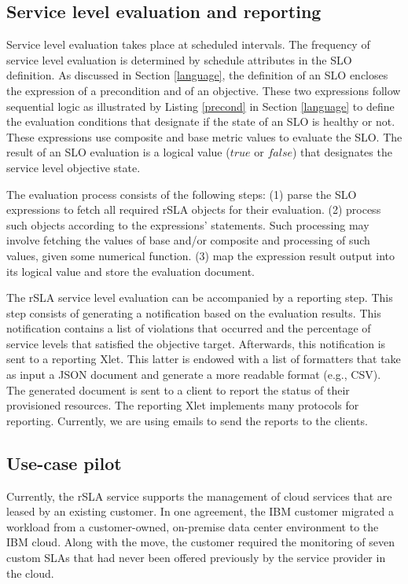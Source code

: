 \subsection{Service level evaluation and reporting}

Service level evaluation takes place at scheduled intervals. The frequency of service level evaluation is determined by schedule attributes in the SLO definition. As discussed in Section \ref{language}, the definition of an SLO encloses the expression of a precondition and of an objective. 
These two expressions follow sequential logic as illustrated by Listing \ref{precond} in Section \ref{language} to define the evaluation conditions that designate if the state of an SLO is healthy or not. These expressions use composite and base metric values to evaluate the SLO. The result of an SLO evaluation is a logical value ($true$ or $false$) that designates the service level objective state.

The evaluation process consists of the following steps: (1) parse the SLO expressions to fetch all required rSLA objects for their evaluation. (2) process such objects according to the expressions' statements. Such processing may involve fetching the values of base and/or composite and processing of such values, given some numerical function. (3) map the expression result output into its logical value and store the evaluation document.

The rSLA service level evaluation can be accompanied by a reporting step. This step consists of generating a notification based on the evaluation results. This notification contains a list of violations that occurred and the percentage of service levels that satisfied the objective target. Afterwards, this notification is sent to a reporting Xlet. This latter is endowed with a list of formatters that take as input a JSON document and generate a more readable format (e.g., CSV). The generated document is sent to a client to report the status of their provisioned resources. The reporting Xlet implements many protocols for reporting. Currently, we are using emails to send the reports to the clients. 

\subsection{Use-case pilot}

Currently, the rSLA service supports the management of cloud services that are leased by an existing customer. In one agreement, the IBM customer migrated a workload from a customer-owned, on-premise data center environment to the IBM cloud.  Along with the move, the customer required the monitoring of seven custom SLAs that had never been offered previously by the service provider in the cloud.

